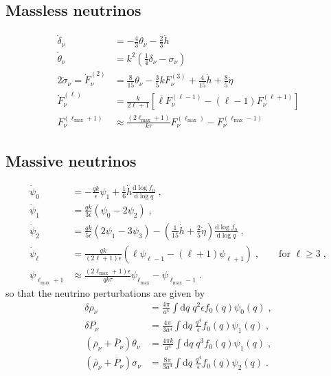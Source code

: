 \documentclass[a4paper]{article}
\newcommand{\dd}{\mathrm{d}}
\begin{document}
\subsection{Massless neutrinos}
\begin{align}
  \dot{\delta}_\nu &= -\frac{4}{3}\theta_\nu - \frac{2}{3}\dot{h} \\
  \dot{\theta}_\nu &= k^2\left( \frac{1}{4}\delta_\nu - \sigma_\nu \right) \\ 
  2 \dot{\sigma}_\nu = \dot{F}_{\nu}^{(2)} &= \frac{8}{15}\theta_\nu - \frac{3}{5}k F_{\nu}^{(3)} + \frac{4}{15} \dot{h} + \frac{8}{5} \dot{\eta}\\
  \dot{F}_{\nu}^{(\ell)} &= \frac{k}{2\ell+1}\left[\ell F_{\nu}^{(\ell-1)}-(\ell-1)F_{\nu}^{(\ell+1)}\right] \\
  F_{\nu}^{(\ell_\text{max}+1)} &\approx \frac{(2\ell_\text{max}+1)}{k\tau} F_{\nu}^{(\ell_\text{max})} - F_{\nu}^{(\ell_\text{max}-1)}  
\end{align}

\subsection{Massive neutrinos}
\begin{align}
  \dot{\psi}_0 &= -\frac{qk}{\epsilon}\psi_1 + \frac{1}{6}\dot{h}\frac{\dd \log f_0}{\dd \log q}\;, \\
  \dot{\psi}_1 &= \frac{qk}{3\epsilon}\left(\psi_0 - 2\psi_2\right)\;,\\
  \dot{\psi}_2 &= \frac{qk}{5\epsilon}\left(2\psi_1 - 3\psi_3\right) - \left(\frac{1}{15}\dot{h} + \frac{2}{5}\dot{\eta}\right)\frac{\dd \log f_0}{\dd \log q}\;,\\
  \dot{\psi}_\ell &= \frac{qk}{(2\ell+1)\epsilon}\left(\ell\psi_{\ell-1} - (\ell+1)\psi_{\ell+1}\right)\;,\qquad\text{for $\ell\ge3$}\;,\\
  \psi_{\ell_\text{max}+1} &\approx \frac{(2\ell_\text{max}+1)\epsilon}{qk\tau} \psi_{\ell_\text{max}} - \psi_{\ell_\text{max}-1}\;.
\end{align}
so that the neutrino perturbations are given by
\begin{align}
  \delta\rho_\nu &= \frac{4\pi}{a^4}\int \dd q\;q^2\epsilon f_0(q)\psi_0(q)\;,\\
  \delta P_\nu &= \frac{4\pi}{3a^4}\int \dd q\;\frac{q^4}{\epsilon} f_0(q)\psi_1(q)\;,\\
  (\overline{\rho}_\nu+\overline{P}_\nu)\theta_\nu &= \frac{4\pi k}{a^4}\int \dd q\;q^3 f_0(q)\psi_1(q)\;,\\
  (\overline{\rho}_\nu+\overline{P}_\nu)\sigma_\nu &= \frac{8\pi}{3a^4}\int \dd q\;\frac{q^4}{\epsilon} f_0(q)\psi_2(q)\;.
\end{align}

  
\end{document}
